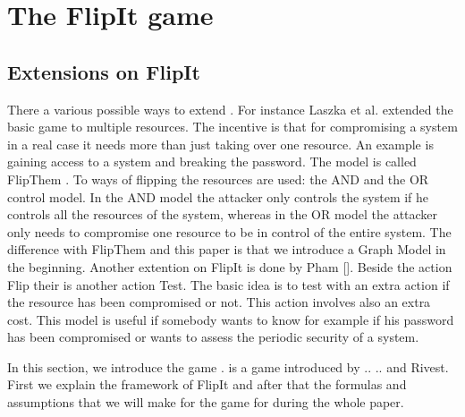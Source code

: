 \chapter{The FlipIt game}
\label{cha:2}


\section{Extensions on FlipIt}

There a various possible ways to extend . For instance Laszka et al. extended the basic  game to multiple resources. The incentive is that for compromising a system in a real case it needs more than just taking over one resource. An example is gaining access to a system and breaking the password. The model is called FlipThem \cite{FlipThem}. To ways of flipping the resources are used: the AND and the OR control model. In the AND model the attacker only controls the system if he controls all the resources of the system, whereas in the OR model the attacker only needs to compromise one resource to be in control of the entire system. The difference with FlipThem and this paper is that we introduce a Graph Model in the beginning.
Another extention on FlipIt is done by Pham []. Beside the action Flip their is another action Test. The basic idea is to test with an extra action if the resource has been compromised or not. This action involves also an extra cost. This model is useful if somebody wants to know for example if his password has been compromised or wants to assess the periodic security of a system.  









In this section, we introduce the game  \cite{FlipIt}.  is a game introduced by .. .. and Rivest. First we explain the framework of FlipIt and after that the formulas and assumptions that we will make for the game for during the whole paper.  

